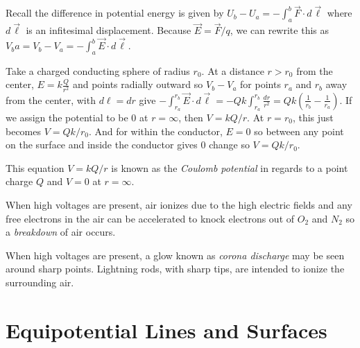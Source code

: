 \begin{remark}
    Recall the difference in potential energy is given by $U_b - U_a = -\int_a^b \vec{F}\cdot d \vec{\ell}$ where $d\vec{\ell}$ is an infitesimal displacement. Because $\vec{E} = \vec{F}/q$, we can rewrite this as $V_ba = V_b-V_a = -\int_a^b\vec{E}\cdot d\vec{\ell}.$
\end{remark}
\begin{example}
    Take a charged conducting sphere of radius $r_0$. At a distance $r>r_0$ from the center, $E = k\frac{Q}{r^2}$ and points radially outward so $V_b - V_a$ for points $r_a$ and $r_b$ away from the center, with $d\ell = dr$ give $-\int_{r_a}^{r_b}\vec{E}\cdot d\vec{\ell} = -Qk\int_{r_a}^{r_b}\frac{dr}{r^2} = Qk(\frac{1}{r_b}-\frac{1}{r_a}).$ If we assign the potential to be $0$ at $r=\infty$, then $V = kQ/r.$ At $r = r_0$, this just becomes $V = Qk/r_0.$ And for within the conductor, $E = 0$ so between any point on the surface and inside the conductor gives 0 change so $V = Qk/r_0.$
\end{example}
\begin{note}
    This equation $V = kQ/r$ is known as the \emph{Coulomb potential} in regards to a point charge $Q$ and $V = 0$ at $r = \infty$.
\end{note}
\begin{definition}[Breakdown]
    When high voltages are present, air ionizes due to the high electric fields and any free electrons in the air can be accelerated to knock electrons out of $O_2$ and $N_2$ so a \emph{breakdown} of air occurs.
\end{definition}
\begin{note}
    When high voltages are present, a glow known as \emph{corona discharge} may be seen around sharp points. Lightning rods, with sharp tips, are intended to ionize the surrounding air. 
\end{note}

\section{Equipotential Lines and Surfaces}

